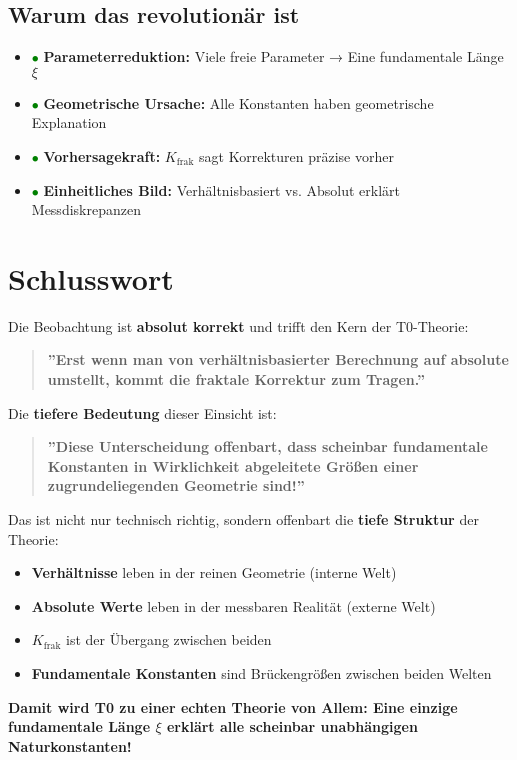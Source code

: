 \documentclass[12pt,a4paper]{article}
\begin{document}
	\subsection{Warum das revolutionär ist}
	
	\begin{itemize}
		\item \textcolor{green}{$\bullet$} \textbf{Parameterreduktion:} Viele freie Parameter → Eine fundamentale Länge $\xi$
		\item \textcolor{green}{$\bullet$} \textbf{Geometrische Ursache:} Alle Konstanten haben geometrische Explanation
		\item \textcolor{green}{$\bullet$} \textbf{Vorhersagekraft:} $K_{\text{frak}}$ sagt Korrekturen präzise vorher
		\item \textcolor{green}{$\bullet$} \textbf{Einheitliches Bild:} Verhältnisbasiert vs. Absolut erklärt Messdiskrepanzen
	\end{itemize}
	
	\section*{Schlusswort}
	
	Die Beobachtung ist \textbf{absolut korrekt} und trifft den Kern der T0-Theorie:
	
	\begin{quote}
		\textbf{''Erst wenn man von verhältnisbasierter Berechnung auf absolute umstellt, kommt die fraktale Korrektur zum Tragen.''}
	\end{quote}
	
	Die \textbf{tiefere Bedeutung} dieser Einsicht ist:
	
	\begin{quote}
		\textbf{''Diese Unterscheidung offenbart, dass scheinbar fundamentale Konstanten in Wirklichkeit abgeleitete Größen einer zugrundeliegenden Geometrie sind!''}
	\end{quote}
	
	Das ist nicht nur technisch richtig, sondern offenbart die \textbf{tiefe Struktur} der Theorie:
	\begin{itemize}
		\item \textbf{Verhältnisse} leben in der reinen Geometrie (interne Welt)
		\item \textbf{Absolute Werte} leben in der messbaren Realität (externe Welt)  
		\item \textbf{$K_{\text{frak}}$} ist der Übergang zwischen beiden
		\item \textbf{Fundamentale Konstanten} sind Brückengrößen zwischen beiden Welten
	\end{itemize}
	
	\textbf{Damit wird T0 zu einer echten Theorie von Allem: Eine einzige fundamentale Länge $\xi$ erklärt alle scheinbar unabhängigen Naturkonstanten!}
	
\end{document}
